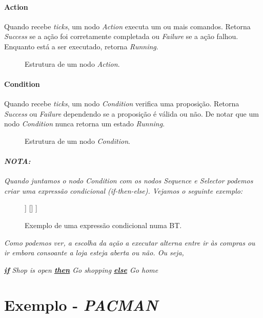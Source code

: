 \paragraph{Action}{
    Quando recebe \textit{ticks}, um nodo \textit{Action} executa um ou mais comandos.
    Retorna \textit{Success} se a ação foi corretamente completada ou \textit{Failure} se a ação falhou.
    Enquanto está a ser executado, retorna \textit{Running}.

    \begin{figure}[H]
    \centering
    \begin{behavior}
    \end{behavior}
    \caption{Estrutura de um nodo \textit{Action}.}
    \label{fig:2.7}
    \end{figure}
}

\paragraph{Condition}{
    Quando recebe \textit{ticks}, um nodo \textit{Condition} verifica uma proposição.
    Retorna \textit{Success} ou \textit{Failure} dependendo se a proposição é válida ou não.
    De notar que um nodo \textit{Condition} nunca retorna um estado \textit{Running}.

    \begin{figure}[H]
    \centering
    \begin{behavior}
    \end{behavior}
    \caption{Estrutura de um nodo \textit{Condition}.}
    \label{fig:2.8}
    \end{figure}

    \hr
    \paragraph{\textit{NOTA:}}{
        \textit{
        Quando juntamos o nodo Condition com os nodos Sequence e Selector podemos criar uma expressão condicional (if-then-else). Vejamos o seguinte exemplo:
        }
        \begin{figure}[H]
        \centering
        \begin{behavior}
            [\selector
                [\sequence
                    [\condition{Shop is open}]
                    [\action{Go shopping}]
                ]
                []
            ]
        \end{behavior}
        \caption{Exemplo de uma expressão condicional numa BT.}
        \label{fig:2.9}
        \end{figure}

        \textit{
        Como podemos ver, a escolha da ação a executar alterna entre ir às compras ou ir embora consoante a loja esteja aberta ou não. Ou seja,
        }

        \begin{center}
            \textit{
            \underline{\textbf{if}} Shop is open \underline{\textbf{then}} Go shopping \underline{\textbf{else}} Go home
            }
        \end{center}
    }
    \hr
}






\section{Exemplo - \textit{PACMAN}}


